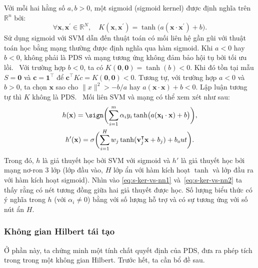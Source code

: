 \begin{exmp}
  Với mỗi hai hằng số $a, b > 0$, một  sigmoid (sigmoid kernel) được
  định nghĩa trên $\mathbb{R}^n$ bởi: \begin{equation}
    \forall \mathbf{x}, \mathbf{x}^\prime \in \mathbb{R}^N, \quad K(\mathbf{x},
    \mathbf{x}^\prime) = \tanh\bigl(a(\mathbf{x} \cdot \mathbf{x}^\prime) + b
    \bigr).
  \end{equation} Sử dụng  sigmoid với SVM dẫn đến thuật toán có mối
  liên hệ gần gũi với thuật toán học bằng mạng  thường được định
  nghĩa qua hàm sigmoid. Khi $a < 0$ hay $b < 0$,  không phải là PDS
  và mạng  tương ứng không đảm bảo hội tụ bởi tối ưu lồi.
  \elaborate\ Với trường hợp $b < 0$, ta có $K(\mathbf{0}, \mathbf{0}) =
  \tanh(b) < 0$. Khi đó tồn tại mẫu $S = {\mathbf{0}}$ và 
  $\mathbf{c} = \mathbf{1}^\intercal$ để $\mathbf{c}^\intercal K c = K(\mathbf{0},
  \mathbf{0}) < 0$. Tương tự, với trường hợp $a < 0$ và $b > 0$, ta chọn
  $\mathbf{x}$ sao cho $\lVert x\rVert^2 > -b / a$ hay $a(\mathbf{x} \cdot
  \mathbf{x}) + b < 0$. Lập luận tương tự thì $K$ không là PDS. \elaborate\ Mối
  liên SVM và mạng  có thể xem xét như sau:
  \begin{gather}\label{eq:s-ker-vs-nn1}
    h(\mathbf{x}) = \sign\biggl(\sum_{i = 1}^m \alpha_iy_i \tanh\bigl(
    a(\mathbf{x_i} \cdot \mathbf{x}) + b\bigr)\biggr), \\
    \label{eq:s-ker-vs-nn2}
    h'(\mathbf{x}) = \sigma\biggl(\sum_{i = 1}^Hw_j\tanh(\mathbf{v}_j^\intercal
    \mathbf{x} + b_j) + b_out\biggr).
  \end{gather}Trong đó, $h$ là giả thuyết học bởi SVM với  sigmoid
  và $h'$ là giả thuyết học bởi mạng nơ-ron 3 lớp (lớp đầu vào, $H$ lớp ẩn với
  hàm kích hoạt $\tanh$ và lớp đầu ra với hàm kích hoạt sigmoid). Nhìn vào
  \eqref{eq:s-ker-vs-nn1} và~\eqref{eq:s-ker-vs-nn2} ta thấy rằng có nét tương
  đồng giữa hai giả thuyết được học. Số lượng biểu thức có ý nghĩa trong $h$
  (với $\alpha_i \ne 0$) bằng với số lượng  hỗ trợ và có sự tương
  ứng với số nút ẩn $H$.
\end{exmp}

\subsubsection{Không gian Hilbert \protect{} tái tạo}

Ở phần này, ta chứng minh một tính chất quyết định của  PDS, đưa ra
phép tích trong trong một không gian Hilbert. Trước hết, ta cần bổ đề sau.

